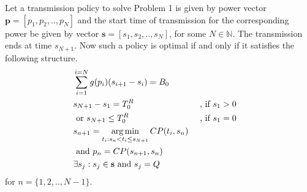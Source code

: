 \begin{theorem}
Let a transmission policy to solve Problem 1 is given by power vector $\textbf{p}=[p_1,p_2,..,p_N]$ and the start time of transmission for the corresponding power be given by vector $\textbf{s}=[s_1,s_2,..,s_N]$, for some $N\in \mathbb{N}$. The transmission ends at time $s_{N+1}$. Now such a policy is optimal if and only if it satisfies the following structure.
\label{th_algo1_1}
\begin{align}
&\sum_{i=1}^{i=N}g(p_i)(s_{i+1}-s_i)=B_0\label{claim1}
\\
&\nonumber s_{N+1}-s_1=T^R_0 				&&\text{ , if } s_1>0
\\
& \text{ or } s_{N+1}\le T^R_0 				&&\text{ , if } s_1=0\label{claim2}
\\
&\nonumber s_{n+1}=\argmin_{t_i: s_n < t_i \le s_{N+1}} CP(t_i,s_n)
\\
&\text{ and } p_n=CP(s_{n+1},s_n)\label{claim3}
\\
&\exists s_j:s_j\in \textbf{s} \text{ and } s_j=Q\label{claim4}
\end{align}
for $n=\{ 1,2,..,N-1\}$.
\end{theorem}
